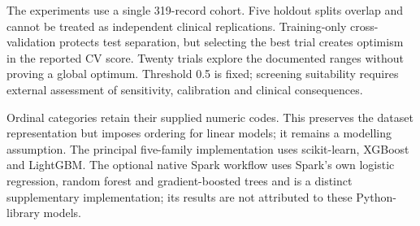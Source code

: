 The experiments use a single 319-record cohort. Five holdout splits overlap and cannot be treated as independent clinical replications. Training-only cross-validation protects test separation, but selecting the best trial creates optimism in the reported CV score. Twenty trials explore the documented ranges without proving a global optimum. Threshold 0.5 is fixed; screening suitability requires external assessment of sensitivity, calibration and clinical consequences.

Ordinal categories retain their supplied numeric codes. This preserves the dataset representation but imposes ordering for linear models; it remains a modelling assumption. The principal five-family implementation uses scikit-learn, XGBoost and LightGBM. The optional native Spark workflow uses Spark's own logistic regression, random forest and gradient-boosted trees and is a distinct supplementary implementation; its results are not attributed to these Python-library models.
